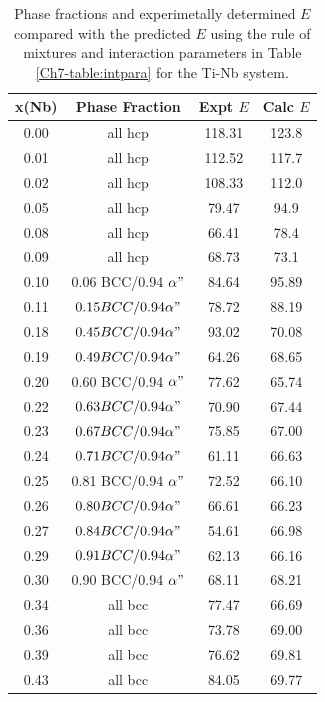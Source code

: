 \newpage
\begin{table}[H]
	\caption{Phase fractions and experimetally determined $E$ compared with the predicted $E$ using the rule of mixtures and interaction parameters in Table \ref{Ch7-table:intpara} for the Ti-Nb system.}
	\centering
	\begin{tabular}{ c c c c}
		\hline
		x(Nb) & Phase Fraction & Expt $E$ & Calc $E$\\
		\hline
		0.00 & all hcp & 118.31 & 123.8\\
		0.01 & all hcp & 112.52 & 117.7\\
		0.02 & all hcp & 108.33 & 112.0\\
		0.05 & all hcp & 79.47 & 94.9\\
		0.08 & all hcp & 66.41 & 78.4\\
		0.09 & all hcp & 68.73 & 73.1\\
		0.10 & 0.06 BCC/0.94 $\alpha"$ & 84.64 & 95.89\\
		0.11 & $0.15 BCC/0.94 \alpha"$ & 78.72 & 88.19\\
		0.18 & $0.45 BCC/0.94 \alpha"$ & 93.02 & 70.08\\
		0.19 & $0.49 BCC/0.94 \alpha"$ & 64.26 & 68.65\\
		0.20 & 0.60 BCC/0.94 $\alpha"$ & 77.62 & 65.74\\
		0.22 & $0.63 BCC/0.94 \alpha"$ & 70.90 & 67.44\\
		0.23 & $0.67 BCC/0.94 \alpha"$ & 75.85 & 67.00\\
		0.24 & $0.71 BCC/0.94 \alpha"$ & 61.11 & 66.63\\
		0.25 & 0.81 BCC/0.94 $\alpha"$ & 72.52 & 66.10\\
		0.26 & $0.80 BCC/0.94 \alpha"$ & 66.61 & 66.23\\
		0.27 & $0.84 BCC/0.94 \alpha"$ & 54.61 & 66.98\\
		0.29 & $0.91 BCC/0.94 \alpha"$ & 62.13 & 66.16\\
		0.30 & 0.90 BCC/0.94 $\alpha"$ & 68.11 & 68.21\\
		0.34 & all bcc & 77.47 & 66.69\\
		0.36 & all bcc & 73.78 & 69.00\\
		0.39 & all bcc & 76.62 & 69.81\\
		0.43 & all bcc & 84.05 & 69.77\\
		\hline
	\end{tabular}
	\label{Ch7-table:elasexptdata}
\end{table}
\clearpage


